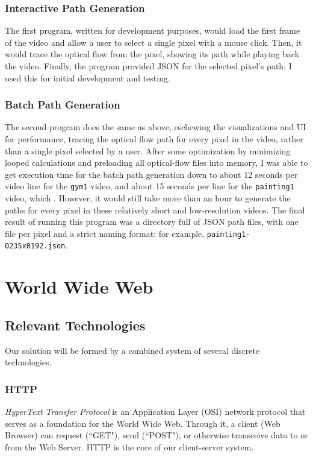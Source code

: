 \subsubsection{Interactive Path Generation}
The first program, written for development purposes, would load the first frame of the video and allow a user to select a single pixel with a mouse click. Then, it would trace the optical flow from the pixel, showing its path while playing back the video. Finally, the program provided JSON for the selected pixel's path; I used this for initial development and testing.
\subsubsection{Batch Path Generation}
The second program does the same as above, eschewing the visualizations and UI for performance, tracing the optical flow path for every pixel in the video, rather than a single pixel selected by a user. After some optimization by minimizing looped calculations and preloading all optical-flow files into memory, I was able to get execution time for the batch path generation down to about 12 seconds per video line for the \texttt{gym1} video, and about 15 seconds per line for the \texttt{painting1} video, which . However, it would still take more than an hour to generate the paths for every pixel in these relatively short and low-resolution videos. The final result of running this program was a directory full of JSON path files, with one file per pixel and a strict naming format: for example, \texttt{painting1-0235x0192.json}.




\section{World Wide Web}
\subsection{Relevant Technologies}
Our solution will be formed by a combined system of several discrete technologies.
\subsubsection{HTTP}
\emph{HyperText Transfer Protocol} is an Application Layer (OSI) network protocol that serves as a foundation for the World Wide Web. Through it, a client (Web Browser) can request (``GET"), send (``POST"), or otherwise transceive data to or from the Web Server. HTTP is the core of our client-server system.
